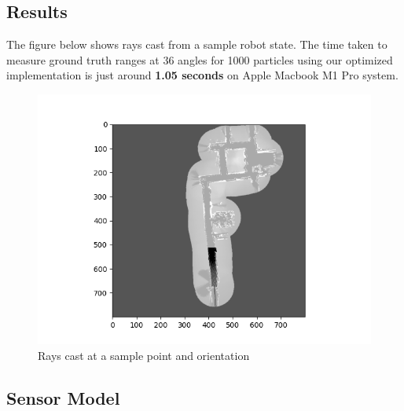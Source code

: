 \documentclass[12pt, a4paper]{article}
\begin{document}
\subsection{Results}

The figure below shows rays cast from a sample robot state. The time taken to measure ground truth ranges at 36 angles for 1000 particles using our optimized implementation is just around \textbf{1.05 seconds} on Apple Macbook M1 Pro system.
\begin{figure}[H]
  \centering
  \includegraphics[width=0.9\linewidth]{results/ray_casting_2.png}
  \caption{Rays cast at a sample point and orientation}
\end{figure}
\subsection{Sensor Model}
\end{document}
